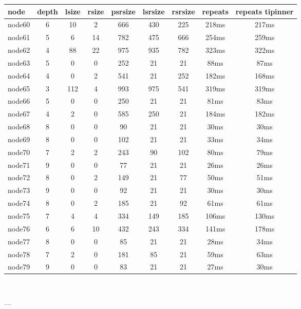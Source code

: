 \begin{tabular}{|l|c|c|c|c|c|c|c|c|}
\hline node & depth & lsize & rsize & psrsize & lsrsize & rsrsize   & repeats & repeats tipinner\\
    \hline node60 & 6 & 10 & 2 & 666 & 430 & 225 & 218ms & 217ms\\
    \hline node61 & 5 & 6 & 14 & 782 & 475 & 666 & 254ms & 259ms\\
    \hline node62 & 4 & 88 & 22 & 975 & 935 & 782 & 323ms & 322ms\\
    \hline node63 & 5 & 0 & 0 & 252 & 21 & 21 & 88ms & 87ms\\
    \hline node64 & 4 & 0 & 2 & 541 & 21 & 252 & 182ms & 168ms\\
    \hline node65 & 3 & 112 & 4 & 993 & 975 & 541 & 319ms & 319ms\\
    \hline node66 & 5 & 0 & 0 & 250 & 21 & 21 & 81ms & 83ms\\
    \hline node67 & 4 & 2 & 0 & 585 & 250 & 21 & 184ms & 182ms\\
    \hline node68 & 8 & 0 & 0 & 90 & 21 & 21 & 30ms & 30ms\\
    \hline node69 & 8 & 0 & 0 & 102 & 21 & 21 & 33ms & 34ms\\
    \hline node70 & 7 & 2 & 2 & 243 & 90 & 102 & 80ms & 79ms\\
    \hline node71 & 9 & 0 & 0 & 77 & 21 & 21 & 26ms & 26ms\\
    \hline node72 & 8 & 0 & 2 & 149 & 21 & 77 & 50ms & 51ms\\
    \hline node73 & 9 & 0 & 0 & 92 & 21 & 21 & 30ms & 30ms\\
    \hline node74 & 8 & 0 & 2 & 185 & 21 & 92 & 61ms & 61ms\\
    \hline node75 & 7 & 4 & 4 & 334 & 149 & 185 & 106ms & 130ms\\
    \hline node76 & 6 & 6 & 10 & 432 & 243 & 334 & 141ms & 178ms\\
    \hline node77 & 8 & 0 & 0 & 85 & 21 & 21 & 28ms & 34ms\\
    \hline node78 & 7 & 2 & 0 & 181 & 85 & 21 & 59ms & 63ms\\
    \hline node79 & 9 & 0 & 0 & 83 & 21 & 21 & 27ms & 30ms\\

\hline
\end{tabular} \

---



